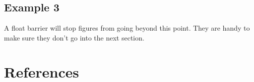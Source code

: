 \subsection{Example 3}



\FloatBarrier
A float barrier will stop figures from going beyond this point. They are handy to make sure they don't go into the next section.

\section{References}
\label{\thesection}
\vspace{-1.5cm}


